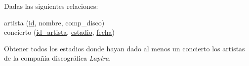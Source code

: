 \documentclass[preview]{standalone}
\begin{document}
Dadas las siguientes relaciones:
\vspace{.2cm}

\begin{center}
artista (\underline{id}, nombre, comp\_disco)\\
\vspace{.35cm}
concierto (\underline{id\_artista}, \underline{estadio}, \underline{fecha})\\
\vspace{0.5cm}
\end{center}

Obtener todos los estadios donde hayan dado al menos un concierto los artistas de la compañía discográfica \textit{Laptra}.
\vspace{.35cm}
\end{document}
